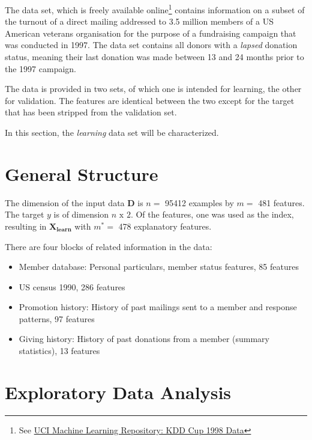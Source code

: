 \documentclass[
  11pt,
  a4paper,
  DIV=12,captions=tableheading,oneside]{scrbook}
\providecommand{\tightlist}{%
  \setlength{\itemsep}{0pt}\setlength{\parskip}{0pt}}
\providecommand{\tightlist}{%
  \setlength{\itemsep}{0pt}\setlength{\parskip}{0pt}}
\begin{document}
The data set, which is freely available online\footnote{See \href{https://archive.ics.uci.edu/ml/datasets/KDD+Cup+1998+Data}{UCI Machine Learning Repository: KDD Cup 1998 Data}} contains information on a subset of the turnout of a direct mailing addressed to 3.5 million members of a US American veterans organisation for the purpose of a fundraising campaign that was conducted in 1997. The data set contains all donors with a \emph{lapsed} donation status, meaning their last donation was made between 13 and 24 months prior to the 1997 campaign.

The data is provided in two sets, of which one is intended for learning, the other for validation. The features are identical between the two except for the target that has been stripped from the validation set.

In this section, the \emph{learning} data set will be characterized.

\hypertarget{general-structure}{%
\section{General Structure}\label{general-structure}}

The dimension of the input data \(\mathbf{D}\) is \(n=\) 95412 examples by \(m=\) 481 features. The target \(y\) is of dimension \(n \text{ x } 2\). Of the features, one was used as the index, resulting in \(\mathbf{X_{learn}}\) with \(m^{*}=\) 478 explanatory features.

There are four blocks of related information in the data:

\begin{itemize}
\tightlist
\item
  Member database: Personal particulars, member status features, 85 features
\item
  US census 1990, 286 features
\item
  Promotion history: History of past mailings sent to a member and response patterns, 97 features
\item
  Giving history: History of past donations from a member (summary statistics), 13 features
\end{itemize}

\hypertarget{exploratory-data-analysis}{%
\section{Exploratory Data Analysis}\label{exploratory-data-analysis}}
\end{document}
